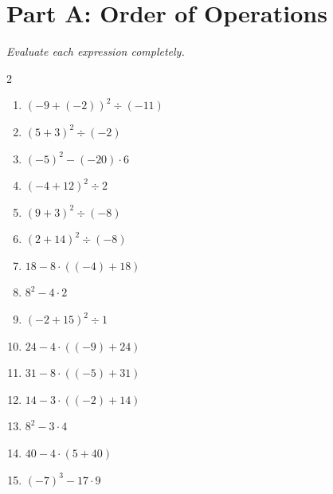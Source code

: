 \documentclass[11pt]{article}
\begin{document}
\section*{Part A: Order of Operations}
\noindent\textit{Evaluate each expression completely.}
\begin{multicols}{2}
\begin{enumerate}
  \item $(-9 + (-2))^{2} \div (-11)$
  \vspace{1.4cm}
  \item $(5 + 3)^{2} \div (-2)$
  \vspace{1.4cm}
  \item $(-5)^{2} - (-20) \cdot 6$
  \vspace{1.4cm}
  \item $(-4 + 12)^{2} \div 2$
  \vspace{1.4cm}
  \item $(9 + 3)^{2} \div (-8)$
  \vspace{1.4cm}
  \item $(2 + 14)^{2} \div (-8)$
  \vspace{1.4cm}
  \item $18 - 8 \cdot ((-4) + 18)$
  \vspace{1.4cm}
  \item $8^{2} - 4 \cdot 2$
  \vspace{1.4cm}
  \item $(-2 + 15)^{2} \div 1$
  \vspace{1.4cm}
  \item $24 - 4 \cdot ((-9) + 24)$
  \vspace{1.4cm}
  \item $31 - 8 \cdot ((-5) + 31)$
  \vspace{1.4cm}
  \item $14 - 3 \cdot ((-2) + 14)$
  \vspace{1.4cm}
  \item $8^{2} - 3 \cdot 4$
  \vspace{1.4cm}
  \item $40 - 4 \cdot (5 + 40)$
  \vspace{1.4cm}
  \item $(-7)^{3} - 17 \cdot 9$
  \vspace{1.4cm}
\end{enumerate}
\end{multicols}
\end{document}
